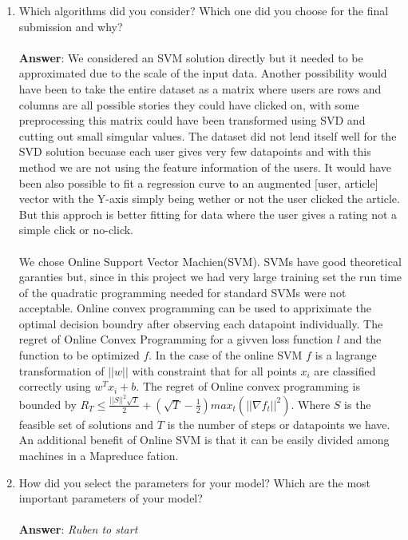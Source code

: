 \documentclass[11pt]{article}
\begin{document}
\begin{enumerate}
\item Which algorithms did you consider? Which one did you choose for the
  final submission and why? \\ \\
\textbf{Answer}:  
We considered an SVM solution directly but it needed to be approximated due to the scale of the input data. Another possibility would have been to take the entire dataset as a matrix where users are rows and columns are all possible stories they could have clicked on, with some preprocessing this matrix could have been transformed using SVD and cutting out small simgular values. The dataset did not lend itself well for the SVD solution becuase each user gives very few datapoints and with this method we are not using the feature information of the users. It would have been also possible to fit a regression curve to an augmented [user, article] vector with the Y-axis simply being wether or not the user clicked the article. But this approch is better fitting for data where the user gives a rating not a simple click or no-click. 
\\ \\
We chose Online Support Vector Machien(SVM). SVMs have good theoretical garanties but, since in this project we had very large training set the run time of the quadratic programming needed for standard SVMs were not acceptable. Online convex programming can be used to appriximate the optimal decision boundry after observing each datapoint individually. The regret of Online Convex Programming for a givven loss function $l$ and the function to be optimized $f$. In the case of the online SVM $f$ is a lagrange transformation of $||w||$ with constraint that for all points $x_i$ are classified correctly using $w^T x_i + b$. The regret of Online convex programming is bounded by $R_T \leq \frac{||S||^2 \sqrt{T}}{2} + (\sqrt{T} - \frac{1}{2}) max_t(||\nabla f_t||^2)$. Where $S$ is the feasible set of solutions and $T$ is the number of steps or datapoints we have. An additional benefit of Online SVM is that it can be easily divided among machines in a Mapreduce fation.  

\item How did you select the parameters for your model? Which are the
  most important parameters of your model? \\ \\
\textbf{Answer}: \emph{Ruben to start}

\end{enumerate}
\end{document}
